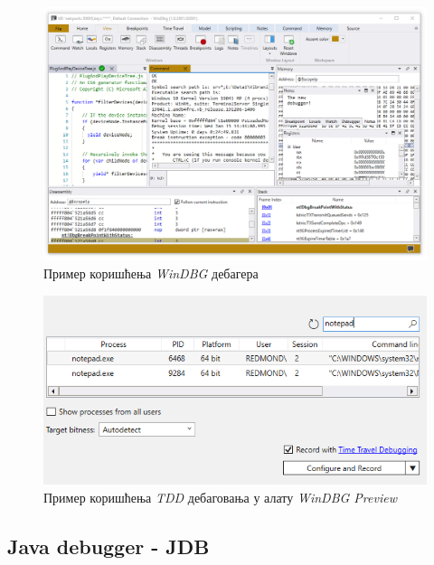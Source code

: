 \documentclass[a4paper]{article}
\begin{document}
\begin{figure}
    \begin{center}
        \includegraphics[width=\textwidth]{slike/windbgx.png}
    \end{center}
    \caption{Пример коришћења {\em WinDBG} дебагера}
    \label{fig:windbg-preview}
\end{figure}

\begin{figure}
    \begin{center}
        \includegraphics[width=\textwidth]{slike/windbgx_tdd.png}
    \end{center}
    \caption{Пример коришћења {\em TDD} дебаговања у алату {\em WinDBG Preview}}
    \label{fig:windbg-tdd}
\end{figure}

\subsection{Java debugger - JDB}
\end{document}
